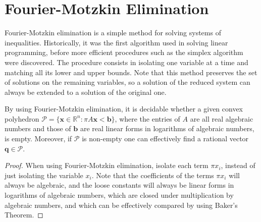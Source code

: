 \section{Fourier-Motzkin Elimination}

Fourier-Motzkin elimination is a simple method for solving systems of
inequalities. Historically, it was the first algorithm used in solving
linear programming, before more efficient procedures such as the
simplex algorithm were discovered. The procedure consists in isolating one
variable at a time and matching all its lower and upper bounds. Note
that this method preserves the set of solutions on the remaining
variables, so a solution of the reduced system can always be extended
to a solution of the original one.

\begin{theorem}
\label{thm:fme}
  By using Fourier-Motzkin elimination, it is decidable whether a
  given convex polyhedron
  $\mathcal{P} = \lbrace \boldsymbol{x} \in \mathbb{R}^{n} : \pi
  A\boldsymbol{x} < \boldsymbol{b} \rbrace$,
  where the entries of $A$ are all real algebraic numbers and
  those of $\boldsymbol{b}$ are real linear forms in logarithms of
  algebraic numbers, is empty.  Moreover, if $\mathcal{P}$ is
  non-empty one can effectively find a rational vector
  $\boldsymbol{q} \in \mathcal{P}$.
\end{theorem}

\begin{proof}
When using Fourier-Motzkin elimination, isolate each term $\pi x_{i}$, instead of just isolating the variable $x_{i}$. Note that the coefficients of the terms $\pi x_{i}$ will always be algebraic, and the loose constants will always be linear forms in logarithms of algebraic numbers, which are closed under multiplication by algebraic numbers, and which can be effectively compared by using Baker's Theorem.
\end{proof}
